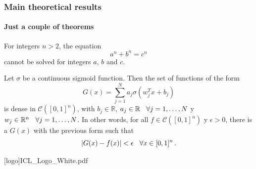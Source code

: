 \documentclass[
	aspectratio=169, %
	t, %
	onlytextwidth, %
	10pt, %
]{beamer}
\begin{document}
\begin{frame}
	\frametitle{Main theoretical results}
	\framesubtitle{Just a couple of theorems}
	
	\begin{theorem}
		For integers $n>2$, the equation
		\[ a^n + b^n = c^n \]
		cannot be solved for integers $a$, $b$ and $c$.
	\end{theorem}

	\begin{theorem}
		\label{teo:AU}
		Let $\sigma$ be a continuous sigmoid function. Then the set of functions of the form
		$$ G(x) = \displaystyle \sum^N_{j=1}a_j\sigma(w^T_jx+b_j)$$
		is dense in $\mathcal{C}([0,1]^n)$, with $b_j \in \mathbb{R}$, $a_j\in \mathbb{R} \hspace{.25cm}\, \forall j=1,\dots,N$ y $w_j \in \mathbb{R}^n \hspace{.25cm}\, \forall j=1,\dots,N$.
		In other words, for all $f\in\mathcal{C}([0,1]^n)$ y $\epsilon>0$, there is a $G(x)$ with the previous form such that
		$$ |G(x)-f(x)|<\epsilon \hspace{.25cm}\, \forall x\in [0,1]^n\,.$$
	\end{theorem}

\end{frame}




\ReferenceSlides










\begingroup
	[logo]{ICL_Logo_White.pdf} %
	\frame[plain, s]{\titlepage} %
\endgroup
\end{document}
